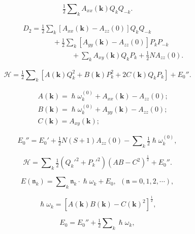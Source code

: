 \documentclass{article}
\begin{document}
\begin{equation} \label{eq:50}
\tfrac{1}{2}\sum\nolimits_kA_{xx}(\mathbf{k})Q_kQ_{-k}.
\end{equation}


\begin{eqnarray} \label{eq:51}
&&D_2=\tfrac{1}{2}\sum\nolimits_k[A_{xx}(\mathbf{k})-A_{zz}(0)]Q_kQ_{-k}\nonumber\\
&&\phantom{~~~~~~~~~~~~~~~~~~~}+\tfrac{1}{2}\sum\nolimits_k[A_{yy}(\mathbf{k})-A_{zz}(0)]P_kP_{-k}\nonumber\\
&&\phantom{~~~~~~~~~~~~~~~~~~~~~~~~~~~~~~~}+\sum\nolimits_kA_{xy}(\mathbf{k})Q_kP_k+\tfrac{1}{2}NA_{zz}(0).
\end{eqnarray}

\begin{equation} \label{eq:52}
\mathcal{H}=\tfrac{1}{2}\sum\nolimits_k[A(\mathbf{k})Q_k^2+B(\mathbf{k})P_k^2+2C(\mathbf{k})Q_kP_k]+E_0''.
\end{equation}

\begin{eqnarray} 
&&A(\mathbf{k})=\hslash\omega_k^{(0)}+A_{xx}(\mathbf{k})-A_{zz}(0); \label{eq:53}\\
&&B(\mathbf{k})=\hslash\omega_k^{(0)}+A_{yy}(\mathbf{k})-A_{zz}(0); \label{eq:54}\\
&&C(\mathbf{k})=A_{xy}(\mathbf{k}); \label{eq:55}
\end{eqnarray}

\begin{equation} \label{eq:56}
E_0''=E_0'+\tfrac{1}{2}N(S+1)A_{zz}(0)-\sum\nolimits_k\tfrac{1}{2}\hslash\omega_k^{(0)},
\end{equation}

\begin{equation} \label{eq:57}
\mathcal{H}=\sum\nolimits_k\tfrac{1}{2}(Q_k'^2+P_k'^2)(AB-C^2)^{\frac{1}{2}}+E_0''.
\end{equation}

\begin{equation} \label{eq:58}
E(\mathfrak{n}_k)=\sum\nolimits_k\mathfrak{n}_k\cdot\hslash\omega_k+E_0,~~(\mathfrak{n}=0,1,2,\cdots),
\end{equation}

\begin{equation} \label{eq:59}
\hslash\omega_k=[A(\mathbf{k})B(\mathbf{k})-C(\mathbf{k})^2]^{\frac{1}{2}},
\end{equation}


\begin{equation} \label{eq:60}
E_0=E_0''+\tfrac{1}{2}\sum\nolimits_k\hslash\omega_k,
\end{equation}
\end{document}
